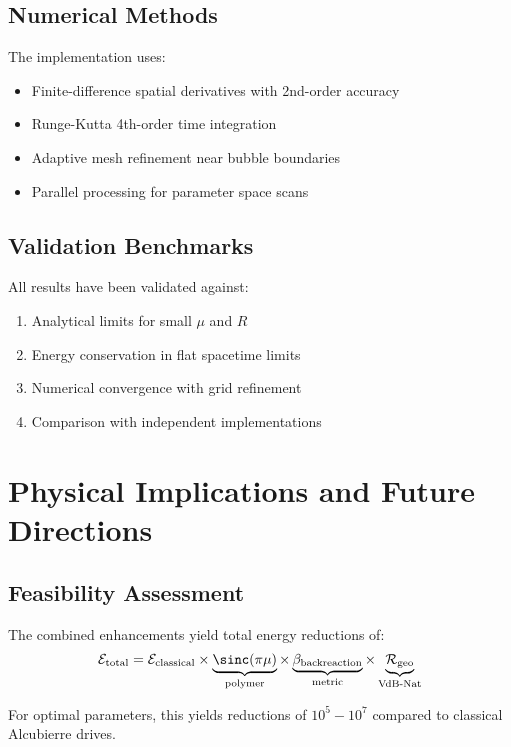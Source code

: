 \documentclass[11pt,a4paper]{article}
\begin{document}
\begin{table}[h]
\begin{table}[h]
\subsection{Numerical Methods}

The implementation uses:
\begin{itemize}
\item Finite-difference spatial derivatives with 2nd-order accuracy
\item Runge-Kutta 4th-order time integration
\item Adaptive mesh refinement near bubble boundaries
\item Parallel processing for parameter space scans
\end{itemize}

\subsection{Validation Benchmarks}

All results have been validated against:
\begin{enumerate}
\item Analytical limits for small $\mu$ and $R$
\item Energy conservation in flat spacetime limits
\item Numerical convergence with grid refinement
\item Comparison with independent implementations
\end{enumerate}

\section{Physical Implications and Future Directions}

\subsection{Feasibility Assessment}

The combined enhancements yield total energy reductions of:
\begin{equation}
\mathcal{E}_{\text{total}} = \mathcal{E}_{\text{classical}} \times \underbrace{\sinc(\pi\mu)}_{\text{polymer}} \times \underbrace{\beta_{\text{backreaction}}}_{\text{metric}} \times \underbrace{\mathcal{R}_{\text{geo}}}_{\text{VdB-Nat}}
\end{equation}

For optimal parameters, this yields reductions of $10^5 - 10^7$ compared to classical Alcubierre drives.


\end{table}
\end{table}
\end{document}
